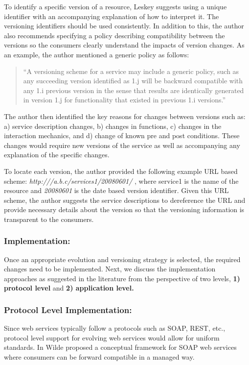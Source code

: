\documentclass[runningheads,a4paper]{llncs}
\begin{document}
To identify a specific version of a resource, Leskey suggests using a unique identifier with an accompanying explanation of how to interpret it. The versioning identifiers should be used consistently. In addition to this, the author also recommends specifying a policy describing compatibility between the versions so the consumers clearly understand the impacts of version changes. As an example, the author mentioned a generic policy as follows:

\begin{quote}
``A versioning scheme for a service may include a generic policy, such as any succeeding version identified as 1.j will be backward compatible with any 1.i previous version in the sense that results are identically generated in version 1.j for functionality that existed in previous 1.i versions.''
\end{quote}

The author then identified the key reasons for changes between versions such as: a) service description changes, b) changes in functions, c) changes in the interaction mechanics, and d) change of known pre and post conditions. These changes would require new versions of the service as well as accompanying any explanation of the specific changes.

To locate each version, the author provided the following example URL based scheme: \emph{http:///a.b.c/services1/20080601/} , where service1 is the name of the resource and \emph{20080601} is the date based version identifier. Given this URL scheme, the author suggests the service descriptions to dereference the URL and provide necessary details about the version so that the versioning information is transparent to the consumers.

\subsubsection{Implementation:}
Once an appropriate evolution and versioning strategy is selected, the required changes need to be implemented. Next, we discuss the implementation approaches as suggested in the literature from the perspective of two levels, \textbf{1) protocol level} and \textbf{2) application level.}

\subsubsection{Protocol Level Implementation:}
Since web services typically follow a protocols such as SOAP, REST, etc., protocol level support for evolving web services would allow for uniform standards. In \cite{wilde2004semantically} Wilde proposed a conceptual framework for SOAP web services where consumers can be forward compatible in a managed way.
\end{document}
